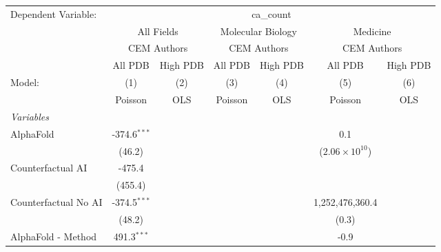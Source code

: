 \begingroup
\centering
\begin{tabular}{lcccccc}
   \tabularnewline \midrule \midrule
   Dependent Variable: & \multicolumn{6}{c}{ca\_count}\\
 & \multicolumn{2}{c}{All Fields} & \multicolumn{2}{c}{Molecular Biology} & \multicolumn{2}{c}{Medicine} \\
\cmidrule(lr){2-3} \cmidrule(lr){4-5} \cmidrule(lr){6-7}
 & \multicolumn{2}{c}{CEM Authors} & \multicolumn{2}{c}{CEM Authors} & \multicolumn{2}{c}{CEM Authors} \\
\cmidrule(lr){2-3} \cmidrule(lr){4-5} \cmidrule(lr){6-7}
 & \multicolumn{1}{c}{All PDB} & \multicolumn{1}{c}{High PDB} & \multicolumn{1}{c}{All PDB} & \multicolumn{1}{c}{High PDB} & \multicolumn{1}{c}{All PDB} & \multicolumn{1}{c}{High PDB} \\
\cmidrule(lr){2-2} \cmidrule(lr){3-3} \cmidrule(lr){4-4} \cmidrule(lr){5-5} \cmidrule(lr){6-6} \cmidrule(lr){7-7}
   Model:                                                     & (1)             & (2)  & (3)     & (4)  & (5)                           & (6)\\  
                                                              &  Poisson        & OLS  & Poisson & OLS  & Poisson                       & OLS\\  
   \midrule
   \emph{Variables}\\
   AlphaFold                                                  & -374.6$^{***}$  &      &         &      & 0.1                           &   \\   
                                                              & (46.2)          &      &         &      & ($2.06\times 10^{10}$)        &   \\   
   Counterfactual AI                                          & -475.4          &      &         &      &                               &   \\   
                                                              & (455.4)         &      &         &      &                               &   \\   
   Counterfactual No AI                                       & -374.5$^{***}$  &      &         &      & 1,252,476,360.4               &   \\   
                                                              & (48.2)          &      &         &      & (0.3)                         &   \\   
   AlphaFold - Method                                         & 491.3$^{***}$   &      &         &      & -0.9                          &   \\   

\end{tabular}
